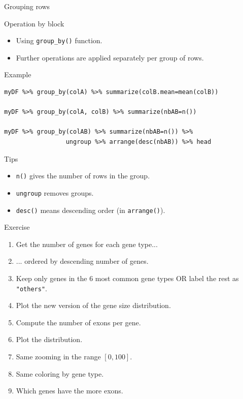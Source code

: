 \documentclass[10pt]{beamer}
\begin{document}
\begin{frame}[fragile]{Grouping rows}
  \begin{block}{Operation by block}
    \begin{itemize}
    \item Using \verb!group_by()! function.
    \item Further operations are applied separately per group of rows.
    \end{itemize}
  \end{block}
  \begin{exampleblock}{Example}
\begin{verbatim}
myDF %>% group_by(colA) %>% summarize(colB.mean=mean(colB))

myDF %>% group_by(colA, colB) %>% summarize(nbAB=n())

myDF %>% group_by(colAB) %>% summarize(nbAB=n()) %>% 
                 ungroup %>% arrange(desc(nbAB)) %>% head
\end{verbatim}
  \end{exampleblock}
  \begin{block}{Tips}
    \begin{itemize}
    \item \verb!n()! gives the number of rows in the group.
    \item \verb!ungroup! removes groups.
    \item \verb!desc()! means descending order (in \verb!arrange()!).
    \end{itemize}
  \end{block}
\end{frame}

\begin{frame}[fragile]{Exercise}
  \begin{enumerate}
  \item Get the number of genes for each gene type...
  \item ... ordered by descending number of genes.
  \item Keep only genes in the 6 most common gene types OR label the rest as \verb!"others"!.
  \item Plot the new version of the gene size distribution.
    \bigskip
  \item Compute the number of exons per gene.
  \item Plot the distribution.
  \item Same zooming in the range $[0,100]$.
  \item Same coloring by gene type.
  \item Which genes have the more exons.
  \end{enumerate}
\end{frame}
\end{document}
